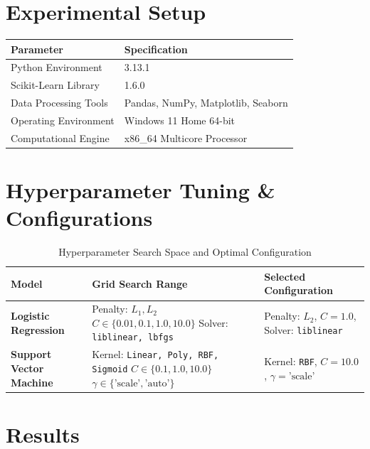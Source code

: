 \documentclass[12pt,a4paper]{article}
\begin{document}
\section{Experimental Setup}
\begin{tabular}{ll}
\toprule
\textbf{Parameter} & \textbf{Specification} \\
\midrule
Python Environment & 3.13.1 \\
Scikit-Learn Library & 1.6.0 \\
Data Processing Tools & Pandas, NumPy, Matplotlib, Seaborn \\
Operating Environment & Windows 11 Home 64-bit \\
Computational Engine & x86\_64 Multicore Processor \\
\bottomrule
\end{tabular}

\section{Hyperparameter Tuning \& Configurations}

\begin{table}[H]
\centering
\caption{Hyperparameter Search Space and Optimal Configuration}
\label{tab:hyperparams}
\small
\begin{tabular}{|p{4cm}|p{5cm}|p{4.5cm}|}
\hline
\textbf{Model} & \textbf{Grid Search Range} & \textbf{Selected Configuration} \\ \hline
\textbf{Logistic Regression} & Penalty: $L_1, L_2$ \newline $C \in \{0.01, 0.1, 1.0, 10.0\}$ \newline Solver: \texttt{liblinear, lbfgs} & Penalty: $L_2$, $C = 1.0$, Solver: \texttt{liblinear} \\ \hline
\textbf{Support Vector Machine} & Kernel: \texttt{Linear, Poly, RBF, Sigmoid} \newline $C \in \{0.1, 1.0, 10.0\}$ \newline $\gamma \in \{\text{'scale'}, \text{'auto'}\}$ & Kernel: \texttt{RBF}, $C = 10.0$, $\gamma = \text{'scale'}$ \\ \hline
\end{tabular}
\end{table}

\section{Results}
\end{document}
